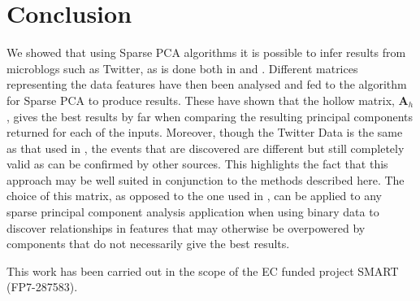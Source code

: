 \documentclass[graybox]{svmult}
\newcommand{\covmat}{\mathbf{A}}
\begin{document}
\section{Conclusion}\label{conclusion}

We showed that using Sparse PCA algorithms it is possible to infer results from microblogs such as Twitter, as is done both in \cite{dimakis} and \cite{microblogs}. Different matrices representing the data features have then been analysed and fed to the algorithm for Sparse PCA to produce results. These have shown that the hollow matrix, $\covmat_h$, gives the best results by far when comparing the resulting principal components returned for each of the inputs. Moreover, though the Twitter Data is the same as that used in \cite{microblogs}, the events that are discovered are different but still completely valid as can be confirmed by other sources. This highlights the fact that this approach may be well suited in conjunction to the methods described here. The choice of this matrix, as opposed to the one used in \cite{dimakis}, can be applied to any sparse principal component analysis application when using binary data to discover relationships in features that may otherwise be overpowered by components that do not necessarily give the best results. 

\acknowledgement
This work has been carried out in the scope of the EC funded project SMART (FP7-287583). 





{}
\end{document}
